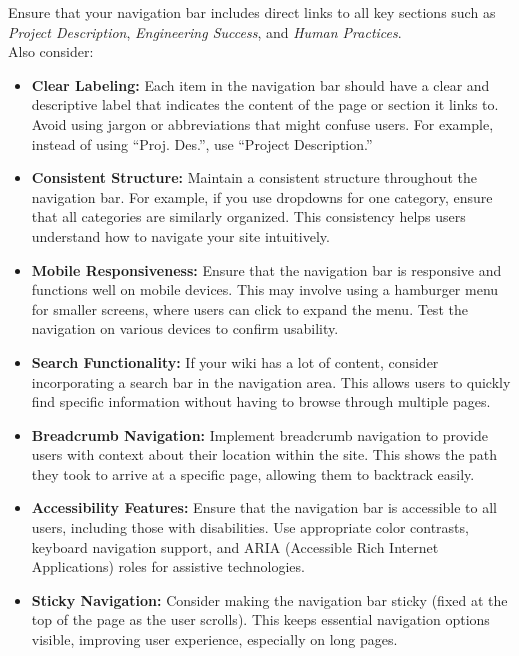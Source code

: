 Ensure that your navigation bar includes direct links to all key sections such as \textit{Project Description}, \textit{Engineering Success}, and \textit{Human Practices}. \\ \newline
Also consider:
\begin{itemize}
    \item \textbf{Clear Labeling:}
    Each item in the navigation bar should have a clear and descriptive label that indicates the content of the page or section it links to.
    Avoid using jargon or abbreviations that might confuse users.
    For example, instead of using ``Proj. Des.'', use ``Project Description.''

    \item \textbf{Consistent Structure:}
    Maintain a consistent structure throughout the navigation bar.
    For example, if you use dropdowns for one category, ensure that all categories are similarly organized.
    This consistency helps users understand how to navigate your site intuitively.

    \item \textbf{Mobile Responsiveness:}
    Ensure that the navigation bar is responsive and functions well on mobile devices.
    This may involve using a hamburger menu for smaller screens, where users can click to expand the menu.
    Test the navigation on various devices to confirm usability.

    \item \textbf{Search Functionality:}
    If your wiki has a lot of content, consider incorporating a search bar in the navigation area.
    This allows users to quickly find specific information without having to browse through multiple pages.

    \item \textbf{Breadcrumb Navigation:}
    Implement breadcrumb navigation to provide users with context about their location within the site.
    This shows the path they took to arrive at a specific page, allowing them to backtrack easily.

    \item \textbf{Accessibility Features:}
    Ensure that the navigation bar is accessible to all users, including those with disabilities.
    Use appropriate color contrasts, keyboard navigation support, and ARIA (Accessible Rich Internet Applications) roles for assistive technologies.

    \item \textbf{Sticky Navigation:}
    Consider making the navigation bar sticky (fixed at the top of the page as the user scrolls).
    This keeps essential navigation options visible, improving user experience, especially on long pages.


\end{itemize}
